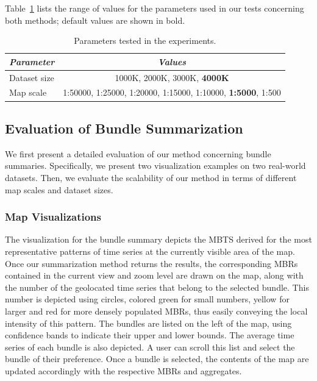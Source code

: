 Table~\ref{tab:parameters1} lists the range of values for the parameters used in our tests concerning both methods; default values are shown in bold.

\begin{table}[ht]
\centering
\caption{Parameters tested in the experiments.}
\begin{small}
\begin{tabular}{lc} 
\hline
{\em Parameter} &{\em Values} \\
\hline
Dataset size & 1000K, 2000K, 3000K, {\bf 4000K} \\
Map scale & 1:50000, 1:25000, 1:20000, 1:15000, 1:10000, {\bf 1:5000}, 1:500 \\
\hline
\end{tabular}
\end{small}
\label{tab:parameters1}
\end{table}

\subsection{Evaluation of Bundle Summarization}
\label{subsec:bundle_sum}

We first present a detailed evaluation of our method concerning bundle summaries. Specifically, we present two visualization examples on two real-world datasets. Then, we evaluate the scalability of our method in terms of different map scales and dataset sizes.

\subsubsection{Map Visualizations}
\label{subsubsec:bundle_sum_vis}

The visualization for the bundle summary depicts the MBTS derived for the most representative patterns of time series at the currently visible area of the map. Once our summarization method returns the results, the corresponding MBRs contained in the current view and zoom level are drawn on the map, along with the number of the geolocated time series that belong to the selected bundle. This number is depicted using circles, colored green for small numbers, yellow for larger and red for more densely populated MBRs, thus easily conveying the local intensity of this pattern. The bundles are listed on the left of the map, using confidence bands to indicate their upper and lower bounds. The average time series of each bundle is also depicted. A user can scroll this list and select the bundle of their preference. Once a bundle is selected, the contents of the map are updated accordingly with the respective MBRs and aggregates.

